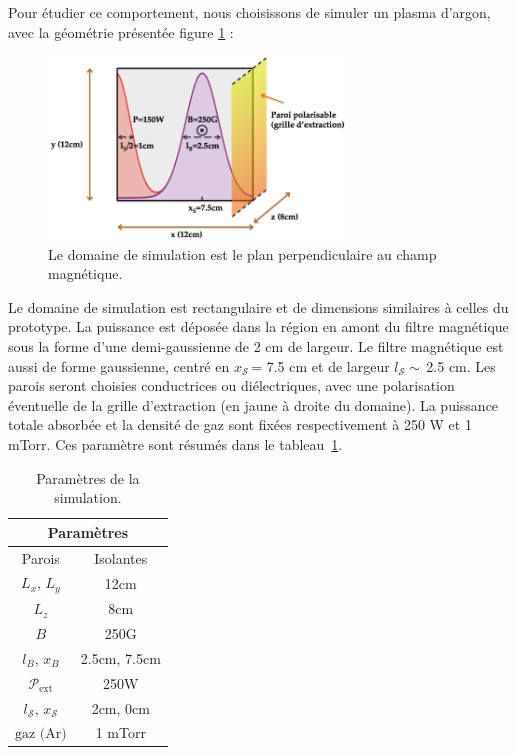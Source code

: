 \begin{refsection}
Pour étudier ce comportement, nous choisissons de
simuler un plasma d'argon, avec la géométrie présentée figure
\ref{4-pegasesSimDomain} :

\begin{figure}[!htbp]
\centering
\includegraphics[width=0.7\textwidth]{figures/4-pegasesSimDomain.png}
{\caption{Le domaine de simulation est le plan perpendiculaire au champ
magnétique.}
\label{4-pegasesSimDomain}}
\end{figure}

Le domaine de simulation est rectangulaire et de
dimensions similaires à celles du prototype. La puissance est déposée dans la
région en amont du filtre magnétique sous la forme d'une demi-gaussienne de 2 cm
de largeur. Le filtre magnétique est aussi de forme gaussienne, centré en
$x_\mathcal{S}\,$= 7.5 cm et de largeur $l_\mathcal{S}\sim\,$2.5 cm. Les parois
seront choisies conductrices ou diélectriques, avec une polarisation éventuelle de la grille
d'extraction (en jaune à droite du domaine). La puissance totale absorbée et la
densité de gaz sont fixées respectivement à 250 W et 1 mTorr. Ces paramètre sont
résumés dans le tableau~\ref{4-PegasesParam1}.

\begin{table}[!htbp]
\footnotesize\centering
{}
\begin{tabular}{cc}\toprule
\multicolumn{2}{c}{\bf Paramètres}\\
\midrule 
Parois & Isolantes\\
$L_x$, $L_y$ & 12cm\\
$L_z$ & 8cm\\
$B$&250G\\
$l_B$, $x_B$&2.5cm, 7.5cm\\
$\mathcal{P}_\text{ext}$&250W\\
$l_\mathcal{S}$, $x_\mathcal{S}$&2cm, 0cm\\
$\text{gaz (Ar)}$ & 1 mTorr\\
\bottomrule
\end{tabular}
\caption{Paramètres de la simulation.}\label{4-PegasesParam1}
\end{table}


\end{refsection}
